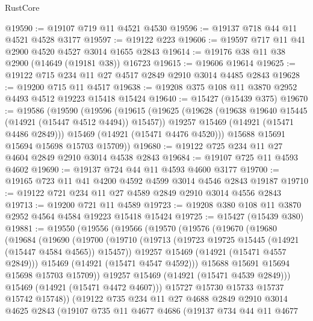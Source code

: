 \begin{lexlean}{RustCore}
\begin{coremodule}
@19590 := @19107 @719 @11 @4521 @4530
@19596 := @19137 @718 @44 @11 @4521 @4528 @3177
@19597 := @19122 @223
@19606 := @19597 @717 @11 @41 @2900 @4520 @4527 @3014 @1655 @2843
@19614 := @19176 @38 @11 @38 @2900 (@14649 (@19181 @38)) @16723
@19615 := @19606 @19614
@19625 := @19122 @715 @234 @11 @27 @4517 @2849 @2910 @3014 @4485 @2843
@19628 := @19200 @715 @11 @4517
@19638 := @19208 @375 @108 @11 @3870 @2952 @4493 @4512 @19223 @15418 @15424
@19640 := @15427 (@15439 @375)
@19670 := @19586
    (@19590
      (@19596
        (@19615
          (@19625
            (@19628 (@19638 @19640 @15445 (@14921 (@15447 @4512 @4494)) @15457))
            @19257
            @15469
            (@14921 (@15471 @4486 @2849)))
          @15469
          (@14921 (@15471 @4476 @4520)))
        @15688
        @15691
        @15694
        @15698
        @15703
        @15709))
@19680 := @19122 @725 @234 @11 @27 @4604 @2849 @2910 @3014 @4538 @2843
@19684 := @19107 @725 @11 @4593 @4602
@19690 := @19137 @724 @44 @11 @4593 @4600 @3177
@19700 := @19165 @723 @11 @41 @4200 @4592 @4599 @3014 @4546 @2843 @19187
@19710 := @19122 @721 @234 @11 @27 @4589 @2849 @2910 @3014 @4556 @2843
@19713 := @19200 @721 @11 @4589
@19723 := @19208 @380 @108 @11 @3870 @2952 @4564 @4584 @19223 @15418 @15424
@19725 := @15427 (@15439 @380)
@19881 := @19550
    (@19556
      (@19566
        (@19570
          (@19576
            (@19670
              (@19680
                (@19684
                  (@19690
                    (@19700
                      (@19710
                        (@19713 (@19723 @19725 @15445 (@14921 (@15447 @4584 @4565)) @15457))
                        @19257
                        @15469
                        (@14921 (@15471 @4557 @2849)))
                      @15469
                      (@14921 (@15471 @4547 @4592)))
                    @15688
                    @15691
                    @15694
                    @15698
                    @15703
                    @15709))
                @19257
                @15469
                (@14921 (@15471 @4539 @2849)))
              @15469
              (@14921 (@15471 @4472 @4607)))
            @15727
            @15730
            @15733
            @15737
            @15742
            @15748))
        (@19122
          @735
          @234
          @11
          @27
          @4688
          @2849
          @2910
          @3014
          @4625
          @2843
          (@19107
            @735
            @11
            @4677
            @4686
            (@19137
              @734
              @44
              @11
              @4677

\end{coremodule}
\end{lexlean}
